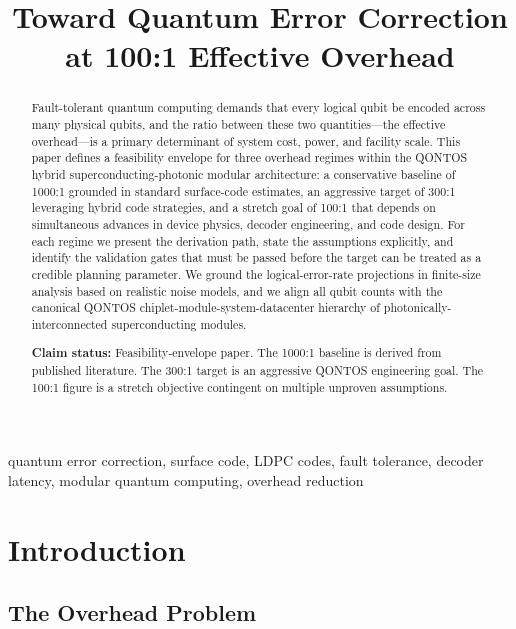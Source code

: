 \documentclass[conference]{IEEEtran}
\begin{document}
\title{Toward Quantum Error Correction at 100:1 Effective Overhead}
\author{\qontosauthor}
\maketitle

\begin{abstract}
Fault-tolerant quantum computing demands that every logical qubit be encoded across many physical qubits, and the ratio between these two quantities---the effective overhead---is a primary determinant of system cost, power, and facility scale. This paper defines a feasibility envelope for three overhead regimes within the QONTOS hybrid superconducting-photonic modular architecture: a conservative baseline of 1000:1 grounded in standard surface-code estimates, an aggressive target of 300:1 leveraging hybrid code strategies, and a stretch goal of 100:1 that depends on simultaneous advances in device physics, decoder engineering, and code design. For each regime we present the derivation path, state the assumptions explicitly, and identify the validation gates that must be passed before the target can be treated as a credible planning parameter. We ground the logical-error-rate projections in finite-size analysis based on realistic noise models, and we align all qubit counts with the canonical QONTOS chiplet-module-system-datacenter hierarchy of photonically-interconnected superconducting modules.

\textbf{Claim status:} Feasibility-envelope paper. The 1000:1 baseline is derived from published literature. The 300:1 target is an aggressive QONTOS engineering goal. The 100:1 figure is a stretch objective contingent on multiple unproven assumptions.
\end{abstract}

\begin{IEEEkeywords}
quantum error correction, surface code, LDPC codes, fault tolerance, decoder latency, modular quantum computing, overhead reduction
\end{IEEEkeywords}

\section{Introduction}

\subsection{The Overhead Problem}
\end{document}
